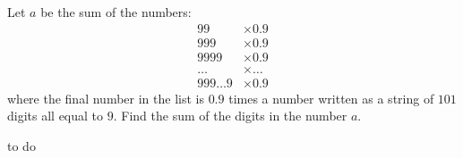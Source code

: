 Let $a$ be the sum of the numbers:
\begin{align*}
99 
& \times 0.9
\\
999 
& \times 0.9
\\
9999 
& \times 0.9
\\
\ldots
& \times \ldots
\\
999\ldots 9 
& \times 0.9
\end{align*}
where the final number in the list is $0.9$ times a number written as a string of $101$ digits all equal to $9$. Find the sum of the digits in the number $a$. 

\begin{answer}
to do
\end{answer}
